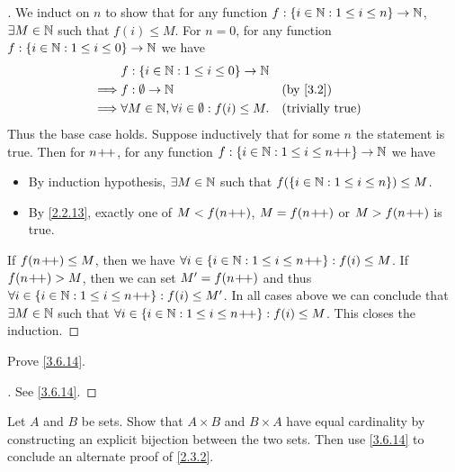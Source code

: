 \begin{proof}[]
	We induct on \(n\) to show that for any function \(f : \left\lbrace i \in \mathbb{N} : 1 \leq i \leq n\right\rbrace \to \mathbb{N}\), \(\exists M \in \mathbb{N}\) such that \(f(i) \leq M\).
	For \(n = 0\), for any function \(f : \left\lbrace i \in \mathbb{N} : 1 \leq i \leq 0\right\rbrace \to \mathbb{N}\) we have
	\begin{align*}
		         & f : \set{i \in \N : 1 \leq i \leq 0} \to \N                                           \\
		\implies & f : \emptyset \to \N                                     &  & \by{3.2}                \\
		\implies & \forall M \in \N, \forall i \in \emptyset : f(i) \leq M. &  & \text{(trivially true)} \\
	\end{align*}
	Thus the base case holds.
	Suppose inductively that for some \(n\) the statement is true.
	Then for \(n\!+\!\!+\), for any function \(f : \left\lbrace i \in \mathbb{N} : 1 \leq i \leq n\!+\!\!+\right\rbrace \to \mathbb{N}\) we have
	\begin{itemize}
		\item By induction hypothesis, \(\exists M \in \mathbb{N}\) such that \(f(\left\lbrace i \in \mathbb{N} : 1 \leq i \leq n\right\rbrace) \leq M\).
		\item By \cref{2.2.13}, exactly one of \(M < f(n\!+\!\!+)\), \(M = f(n\!+\!\!+)\) or \(M > f(n\!+\!\!+)\) is true.
	\end{itemize}
	If \(f(n\!+\!\!+) \leq M\), then we have \(\forall i \in \left\lbrace i \in \mathbb{N} : 1 \leq i \leq n\!+\!\!+\right\rbrace : f(i) \leq M\).
	If \(f(n\!+\!\!+) > M\), then we can set \(M' = f(n\!+\!\!+)\) and thus \(\forall i \in \left\lbrace i \in \mathbb{N} : 1 \leq i \leq n\!+\!\!+\right\rbrace : f(i) \leq M'\).
	In all cases above we can conclude that \(\exists M \in \mathbb{N}\) such that \(\forall i \in \left\lbrace i \in \mathbb{N} : 1 \leq i \leq n\!+\!\!+\right\rbrace : f(i) \leq M\).
	This closes the induction.
\end{proof}

\begin{ex}\label{ex:3.6.4}
	Prove \cref{3.6.14}.
\end{ex}

\begin{proof}[]
	See \cref{3.6.14}.
\end{proof}

\begin{ex}\label{ex:3.6.5}
	Let \(A\) and \(B\) be sets.
	Show that \(A \times B\) and \(B \times A\) have equal cardinality by constructing an explicit bijection between the two sets.
	Then use \cref{3.6.14} to conclude an alternate proof of \cref{2.3.2}.
\end{ex}

